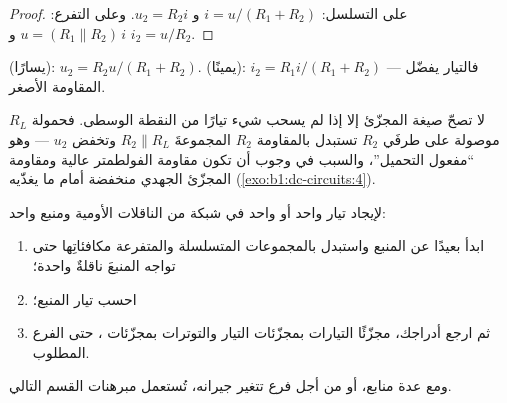 \begin{proof}
على التسلسل: $i = u/(R_1 + R_2)$ و $u_2 = R_2 i$. وعلى التفرع: $u = (R_1
\parallel R_2)\,i$ و $i_2 = u/R_2$.
\end{proof}

\begin{omfigure}

{\small {} (يسارًا): $u_2 = R_2 u/(R_1 + R_2)$.  (يمينًا): $i_2 = R_1 i/(R_1 + R_2)$ --- فالتيار يفضّل
المقاومة الأصغر.}
\end{omfigure}

\begin{remark}\label{rem:b1:dc-circuits:loading}
لا تصحّ صيغة المجزّئ إلا إذا لم يسحب شيء تيارًا من
النقطة الوسطى. فحمولة $R_L$ موصولة على طرفَي $R_2$ تستبدل بالمقاومة $R_2$ المجموعةَ $R_2
\parallel R_L$ وتخفض $u_2$ --- وهو ``مفعول التحميل''، والسبب
في وجوب أن تكون مقاومة الفولطمتر عالية ومقاومة المجزّئ الجهدي
منخفضة أمام ما يغذّيه
(\cref{exo:b1:dc-circuits:4}).
\end{remark}

\begin{method}\label{met:b1:dc-circuits:reduce}
لإيجاد تيار واحد أو  واحد في شبكة من الناقلات الأومية ومنبع
واحد:
\begin{enumerate}
  \item ابدأ بعيدًا عن المنبع واستبدل بالمجموعات المتسلسلة
        والمتفرعة مكافئاتِها حتى تواجه المنبعَ ناقلةٌ
        واحدة؛
  \item احسب تيار المنبع؛
  \item ثم ارجع أدراجك، مجزّئًا التيارات بمجزّئات التيار
        والتوترات بمجزّئات ، حتى الفرع المطلوب.
\end{enumerate}
ومع عدة منابع، أو من أجل فرع تتغير جيرانه، تُستعمل
مبرهنات القسم التالي.
\end{method}

